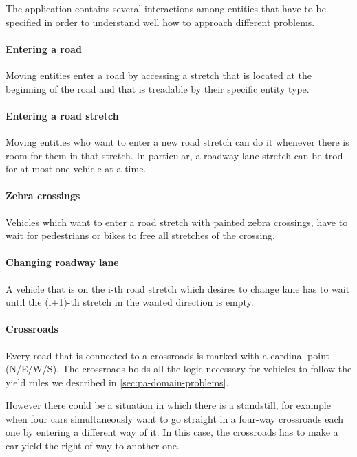 
The application contains several interactions among entities that have to be
specified in order to understand well how to approach different problems.

\paragraph{Entering a road} Moving entities enter a road by accessing a stretch
that is located at the beginning of the road and that is treadable by their
specific entity type.

\paragraph{Entering a road stretch} 
Moving entities who want to enter a new road stretch
can do it whenever there is room for them in that stretch. 
In particular, a roadway lane stretch can be trod for at most 
one vehicle at a time.

\paragraph{Zebra crossings} Vehicles which want to enter a road stretch 
with painted zebra crossings, have to wait for 
pedestrians or bikes to free all stretches of the crossing.

\paragraph{Changing roadway lane} A vehicle that is on the i-th road stretch
which desires to change lane has to wait until the (i+1)-th stretch in the
wanted direction is empty.

\paragraph{Crossroads} Every road that is connected to a crossroads is marked
with a cardinal point (N/E/W/S). The crossroads holds all the logic necessary
for vehicles to follow the yield rules we described in
\ref{sec:pa-domain-problems}.

However there could be a situation in which there is a standstill,
for example when four cars simultaneously want to go straight in
a four-way crossroads each one by entering a different way of it.
In this case, the crossroads has to make a car yield the right-of-way 
to another one.

